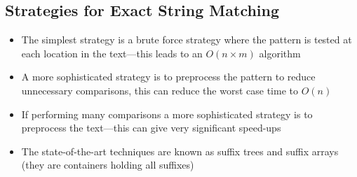 
\begin{slide}
\section[-0.5]{Strategies for Exact String Matching}

\begin{PauseHighLight}
  \begin{itemize}
  \item The simplest strategy is a brute force strategy where the
    pattern is tested at each location in the text---this leads to an
    $O(n\times m)$ algorithm\pause
  \item A more sophisticated strategy is to preprocess the pattern to
    reduce unnecessary comparisons, this can reduce the worst case time
    to $O(n)$\pause
  \item If performing many comparisons a more sophisticated strategy is
    to preprocess the text---this can give very significant
    speed-ups\pause
  \item The state-of-the-art techniques are known as suffix trees and
    suffix arrays (they are containers holding all suffixes)\pause
  \end{itemize}
\end{PauseHighLight}

\end{slide}

